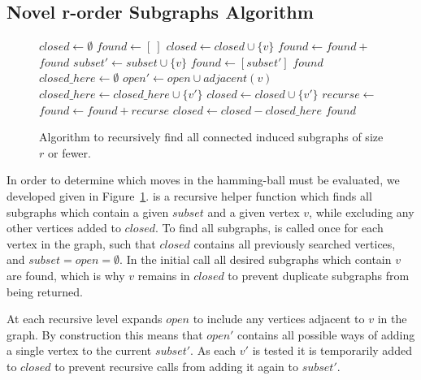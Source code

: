 \documentclass{sig-alternate}
\begin{document}
\subsection{Novel r-order Subgraphs Algorithm}
\begin{figure}
  \begin{algorithmic}[1]
    \State $closed \leftarrow \emptyset$
    \State $found \leftarrow [~]$
      \State $closed \leftarrow closed \cup \{v\}$
      \State $found \leftarrow found + $
    \EndFor
    \State \Return $found$
  \EndProcedure
    \State $subset' \leftarrow subset \cup \{v\}$
    \State $found \leftarrow [subset']$
      \Return $found$
    \EndIf
    \State $closed\_here \leftarrow \emptyset$
    \State $open' \leftarrow open \cup adjacent(v)$
        \State $closed\_here \leftarrow closed\_here \cup \{v'\}$
        \State $closed \leftarrow closed \cup \{v'\}$
        \State $recurse \leftarrow $
        \State $found \leftarrow found + recurse$
    \EndFor
    \State $closed \leftarrow closed - closed\_here$
    \State \Return $found$
  \EndProcedure
\end{algorithmic}
  \caption{Algorithm to recursively find all connected induced subgraphs of size $r$ or fewer.}
  \label{fig-connected-subgraphs}
\end{figure}

In order to determine which moves in the hamming-ball must be evaluated,
we developed  given in Figure~\ref{fig-connected-subgraphs}.
 is a recursive helper function which finds all subgraphs
which contain a given $subset$ and a given vertex $v$, while excluding
any other vertices added to $closed$. To find all subgraphs, 
is called once for each vertex in the graph, such that $closed$ contains
all previously searched vertices, and $subset=open=\emptyset$. In the initial
call all desired subgraphs which contain $v$ are found, which is why $v$ remains
in $closed$ to prevent duplicate subgraphs from being returned.

At each recursive level  expands $open$ to include any vertices
adjacent to $v$ in the graph. By construction this means that $open'$ contains
all possible ways of adding a single vertex to the current $subset'$. As each $v'$
is tested it is temporarily added to $closed$ to prevent recursive calls
from adding it again to $subset'$.
\end{document}
